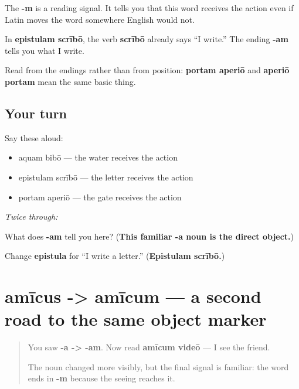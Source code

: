 The \textbf{-m} is a reading signal. It tells you that this word receives the action even if Latin moves the word somewhere English would not.

\begin{grammarlens}[title={Grammar Lens: actor, action, object}]
In \textbf{epistulam scrībō}, the verb \textbf{scrībō} already says \textquotedblleft{}I write.\textquotedblright{} The ending \textbf{-am} tells you what I write.

Read from the endings rather than from position: \textbf{portam aperiō} and \textbf{aperiō portam} mean the same basic thing.
\end{grammarlens}

\subsection*{Your turn}
Say these aloud:

\begin{itemize}
\raggedright
  \item aquam bibō — the water receives the action
  \item epistulam scrībō — the letter receives the action
  \item portam aperiō — the gate receives the action
\end{itemize}

\emph{Twice through:}

\begin{tcolorbox}[breakable,colback=teal!4,colframe=teal!35!black,title={Before you move on}]
What does \textbf{-am} tell you here? (\textbf{This familiar -a noun is the direct object.})

Change \textbf{epistula} for \textquotedblleft{}I write a letter.\textquotedblright{} (\textbf{Epistulam scrībō.})
\end{tcolorbox}
\section[amicus -> amicum; magister -> …]{amīcus -> amīcum — a second road to the same object marker}

\label{lesson:LA-C59-m-objects}



\begin{quote}
You saw \textbf{-a -> -am}. Now read \textbf{amīcum videō} — I see the friend.

The noun changed more visibly, but the final signal is familiar: the word ends in \textbf{-m} because the seeing reaches it.
\end{quote}

